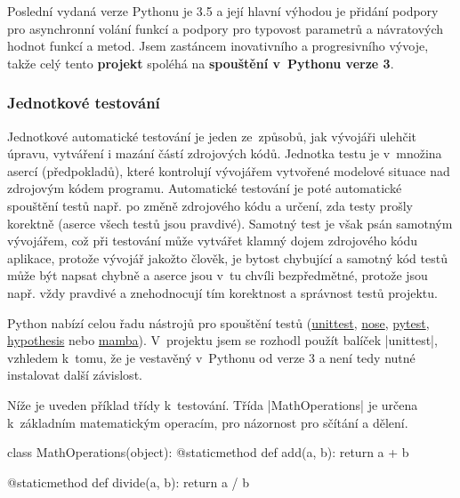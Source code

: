 Poslední vydaná verze Pythonu je 3.5 a její hlavní výhodou je přidání podpory pro asynchronní volání funkcí a podpory pro typovost parametrů a návratových hodnot funkcí a metod. Jsem zastáncem inovativního a progresivního vývoje, takže celý tento \textbf{projekt} spoléhá na \textbf{spouštění v~Pythonu verze 3}.

\subsubsection{Jednotkové testování}
\label{subsubsec:unit-testing}

\begin{sloppypar}
	Jednotkové automatické testování je jeden ze~způsobů, jak vývojáři ulehčit úpravu, vytváření i mazání částí zdrojových kódů. Jednotka testu je v~množina asercí (předpokladů), které kontrolují vývojářem vytvořené modelové situace nad zdrojovým kódem programu. Automatické testování je poté automatické spouštění testů např. po změně zdrojového kódu a určení, zda testy prošly korektně (aserce všech testů jsou pravdivé). Samotný test je však psán samotným vývojářem, což při testování může vytvářet klamný dojem  zdrojového kódu aplikace, protože vývojář jakožto člověk, je bytost chybující a samotný kód testů může být napsat chybně a aserce jsou v~tu chvíli bezpředmětné, protože jsou např. vždy pravdivé a znehodnocují tím korektnost a správnost testů projektu.

	Python nabízí celou řadu nástrojů pro spouštění testů (\href{https://docs.python.org/3/library/unittest.html}{unittest}, \href{https://nose.readthedocs.org/en/latest/}{nose}, \href{http://pytest.org/latest/}{pytest}, \href{https://github.com/DRMacIver/hypothesis}{hypothesis} nebo \href{http://nestorsalceda.github.io/mamba/}{mamba}). V~projektu jsem se rozhodl použít balíček \ic|unittest|, vzhledem k~tomu, že je vestavěný v~Pythonu od verze 3 a není tedy nutné instalovat další závislost.

	Níže je uveden příklad třídy k~testování. Třída \ic|MathOperations| je určena k~základním matematickým operacím, pro názornost pro sčítání a dělení.
\end{sloppypar}

\begin{code}[caption={Příklad třídy $MathOperations$ k~testování}]
class MathOperations(object):
	@staticmethod
	def add(a, b):
		return a + b

	@staticmethod
	def divide(a, b):
		return a / b
\end{code}

